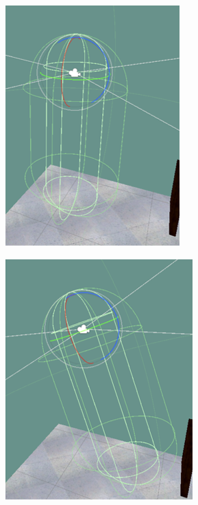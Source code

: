         \begin{figure}[!htb]
            \centering
            \begin{minipage}{0.45\textwidth}
                \centering
                \includegraphics[width = 0.8\linewidth]{Metodologia/envelope1.png}
                \label{fig:user_straight}
            \end{minipage}
            \begin{minipage}{0.45\textwidth}
                \centering
                \includegraphics[width = 0.8\linewidth]{Metodologia/envelope2.png}

\end{minipage}
\end{figure}
